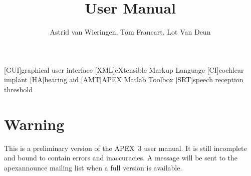 \documentclass[a4paper,12pt]{book}
\title{\apex User Manual}
\author{Astrid van Wieringen, Tom Francart, Lot Van Deun}
\newcommand{\incomplete}[1]{}
\newcommand{\apex}{APEX~3\xspace}
\begin{document}
\begin{acronym}
[GUI]{graphical user interface}
[XML]{eXtensible Markup Language}
[CI]{cochlear implant}
[HA]{hearing aid}
[AMT]{APEX Matlab Toolbox}
[SRT]{speech reception threshold}
\end{acronym}



\maketitle


\section*{Warning}

This is a preliminary version of the \apex user manual. It is still incomplete and bound to contain errors and inaccuracies. A message will be sent to the apexannounce mailing list when a full version is available.


\newpage


\tableofcontents






\incomplete{}


\appendix

\incomplete{}          %
\incomplete{}
\incomplete{}
\incomplete{}




\printindex
\end{document}
